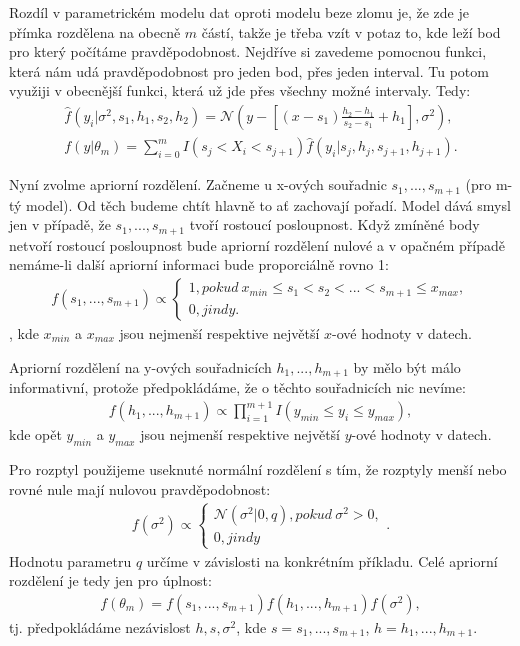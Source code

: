 \documentclass[czech,master,public,dept470,male,cpdeclaration,oneside, python]{diploma}
\begin{document}
Rozdíl v parametrickém modelu dat oproti modelu beze zlomu je, že zde je přímka rozdělena na obecně $m$ částí, takže je třeba vzít v potaz to, kde leží bod pro který počítáme pravděpodobnost. Nejdříve si zavedeme pomocnou funkci, která nám udá pravděpodobnost pro jeden bod, přes jeden interval. Tu potom využiji v obecnější funkci, která už jde přes všechny možné intervaly. Tedy:
\begin{align}\label{parameticky_model}
\hat{f}(y_i | \sigma^2, s_1, h_1, s_2, h_2) = \mathcal{N}(y - [(x - s_1)\frac{h_2 - h_1}{s_2 - s_1} + h_1], \sigma^2), \\
f(y | \theta_m) = \sum_{i=0}^{m} I(s_j < X_i < s_{j+1}) 
\hat{f}(y_i | s_j, h_j, s_{j+1}, h_{j+1}).
\end{align} \par
Nyní zvolme apriorní rozdělení. Začneme u x-ových souřadnic $s_1, ..., s_{m+1}$ (pro m-tý model). Od těch budeme chtít hlavně to ať zachovají pořadí. Model dává smysl jen v případě, že $s_1, ..., s_{m+1}$ tvoří rostoucí posloupnost. Když zmíněné body netvoří rostoucí posloupnost bude apriorní rozdělení nulové a v opačném případě nemáme-li další apriorní informaci bude proporciálně rovno 1:
\begin{align}
f(s_1, ..., s_{m+1}) \propto
	\begin{cases}
		1, pokud\ x_{min} \leq s_1 < s_2 < ... < s_{m+1} \leq x_{max}, \\
		0, jindy.		
	\end{cases}
\end{align},
kde $x_{min}$ a $x_{max}$ jsou nejmenší respektive největší $x$-ové hodnoty v datech. \par
Apriorní rozdělení na y-ových souřadnicích $h_1, ..., h_{m+1}$ by mělo být málo informativní, protože předpokládáme, že o těchto souřadnicích nic nevíme:
\begin{align}
f(h_1,..., h_{m+1}) \propto \prod_{i=1}^{m+1} I(y_{min} \leq y_i \leq y_{max}),
\end{align}
kde opět $y_{min}$ a $y_{max}$ jsou nejmenší respektive největší $y$-ové hodnoty v datech. \par
Pro rozptyl použijeme useknuté normální rozdělení s tím, že rozptyly menší nebo rovné nule mají nulovou pravděpodobnost:
\begin{align}
f(\sigma^2) \propto 
\begin{cases}
\mathcal{N}(\sigma^2 | 0, q), pokud\  \sigma^2 > 0, \\
0, jindy
\end{cases}.
\end{align}
Hodnotu parametru $q$ určíme v závislosti na konkrétním příkladu.
Celé apriorní rozdělení je tedy jen pro úplnost:
\begin{align}\label{apriorni}
f(\theta_m) = f(s_1, ..., s_{m+1})f(h_1,..., h_{m+1})f(\sigma^2),
\end{align}
tj. předpokládáme nezávislost $h,s,\sigma^2$, kde $s=s_1, ..., s_{m+1}$, $h=h_1,..., h_{m+1}$. \par
\end{document}
